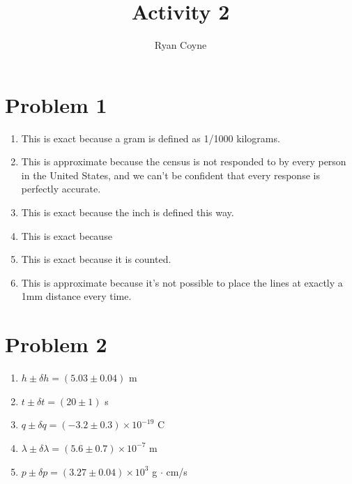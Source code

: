 \documentclass[12pt]{article}
\begin{document}
    \title{Activity 2}
    \author{Ryan Coyne}
    \maketitle

    \section*{Problem 1}

    \begin{enumerate}
        \item This is exact because a gram is defined as 1/1000 kilograms.
        \item This is approximate because the census is not responded to by every person in the United States, and we can't be confident that every response is perfectly accurate.
        \item This is exact because the inch is defined this way.
        \item This is exact because %
        \item This is exact because it is counted.
        \item This is approximate because it's not possible to place the lines at exactly a 1mm distance every time.
    \end{enumerate}

    \section*{Problem 2}
    \begin{enumerate}
        \item \(h\pm\delta h = (5.03\pm0.04)\) m
        \item \(t\pm\delta t = (20\pm1)\) s
        \item \(q\pm\delta q = (-3.2\pm0.3)\times10^{-19}\) C
        \item \(\lambda\pm\delta\lambda = (5.6\pm0.7)\times10^{-7}\) m
        \item \(p\pm\delta p = (3.27\pm0.04)\times10^3\) g \(\cdot\) cm/s 
    \end{enumerate}
    
\end{document}
